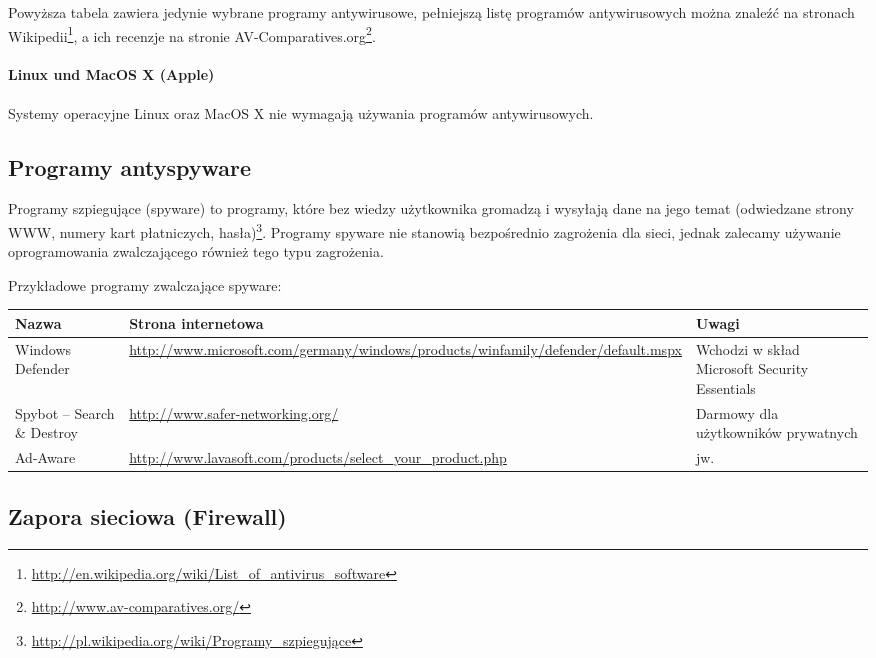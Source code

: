 \documentclass[a4paper,12pt]{scrartcl}
\begin{document}
Powyższa tabela zawiera jedynie wybrane programy antywirusowe, pełniejszą listę programów antywirusowych można znaleźć na stronach Wikipedii\footnote{\url{http://en.wikipedia.org/wiki/List\_of\_antivirus\_software}}, a ich recenzje na stronie AV-Comparatives.org\footnote{\url{http://www.av-comparatives.org/}}.

\paragraph*{Linux und MacOS X (Apple)}

Systemy operacyjne Linux oraz MacOS X nie wymagają używania programów antywirusowych.

\subsection*{Programy antyspyware}

Programy szpiegujące (spyware)  to programy, które bez wiedzy użytkownika gromadzą i wysyłają dane na jego temat (odwiedzane strony WWW, numery kart płatniczych, hasła)\footnote{\url{http://pl.wikipedia.org/wiki/Programy\_szpiegujące}}. Programy spyware nie stanowią bezpośrednio zagrożenia dla sieci, jednak zalecamy używanie oprogramowania zwalczającego również tego typu zagrożenia.

Przykładowe programy zwalczające spyware:

\begin{center}
  \begin{tabularx}{\linewidth}{|p{.18\linewidth}Xp{.3\linewidth}|}
    \hline
    Nazwa & Strona internetowa & Uwagi\\
    \hline \hline
    Windows Defender & \url{http://www.microsoft.com/germany/windows/products/winfamily/defender/default.mspx} & Wchodzi w skład Microsoft Security Essentials\\
    \hline
    Spybot – Search \& Destroy & \url{http://www.safer-networking.org/} & Darmowy dla użytkowników prywatnych\\
    \hline
    Ad-Aware & \url{http://www.lavasoft.com/products/select\_your\_product.php} & jw.\\
    \hline
  \end{tabularx}
\end{center}

\subsection*{Zapora sieciowa (Firewall)}
\end{document}
